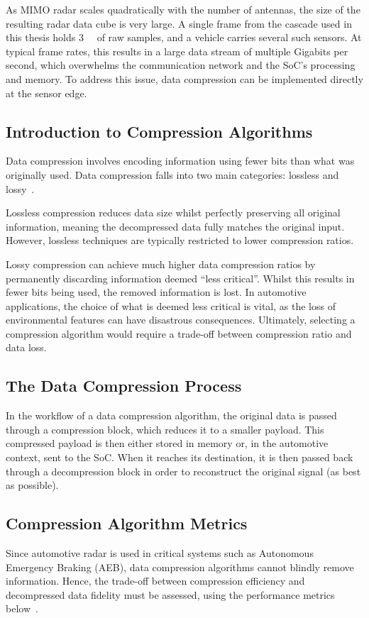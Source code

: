 As MIMO radar scales quadratically with the number of antennas, the size of the resulting radar data cube is very large. A single frame from the cascade used in this thesis holds \SI{3}{\mebi\byte} of raw samples, and a vehicle carries several such sensors. At typical frame rates, this results in a large data stream of multiple Gigabits per second, which overwhelms the communication network and the SoC's processing and memory. To address this issue, data compression can be implemented directly at the sensor edge.

\subsection{Introduction to Compression Algorithms}
\label{sec:compression}
Data compression involves encoding information using fewer bits than what was originally used. Data compression falls into two main categories: lossless and lossy~\cite{sayood2017}.

Lossless compression reduces data size whilst perfectly preserving all original information, meaning the decompressed data fully matches the original input. However, lossless techniques are typically restricted to lower compression ratios.

Lossy compression can achieve much higher data compression ratios by permanently discarding information deemed ``less critical''. Whilst this results in fewer bits being used, the removed information is lost. In automotive applications, the choice of what is deemed less critical is vital, as the loss of environmental features can have disastrous consequences. Ultimately, selecting a compression algorithm would require a trade-off between compression ratio and data loss.

\subsection{The Data Compression Process}

In the workflow of a data compression algorithm, the original data is passed through a compression block, which reduces it to a smaller payload. This compressed payload is then either stored in memory or, in the automotive context, sent to the SoC. When it reaches its destination, it is then passed back through a decompression block in order to reconstruct the original signal (as best as possible).


\subsection{Compression Algorithm Metrics}
\label{sec:metricsbg}
Since automotive radar is used in critical systems such as Autonomous Emergency Braking (AEB), data compression algorithms cannot blindly remove information. Hence, the trade-off between compression efficiency and decompressed data fidelity must be assessed, using the performance metrics below~\cite{sayood2017}.

